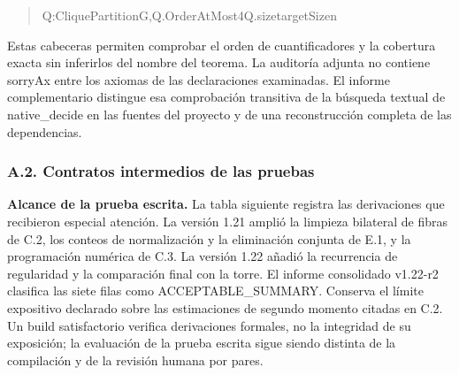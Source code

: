 \documentclass[spanish,11pt,a4paper]{article}
\newlength{\LeanCharWidth}
\begin{document}
\begin{quote}
\noindent \hspace*{\dimexpr 8\LeanCharWidth\relax}{\LeanSymbols ∃}\hspace*{\dimexpr 1\LeanCharWidth\relax}Q\hspace*{\dimexpr 1\LeanCharWidth\relax}:\hspace*{\dimexpr 1\LeanCharWidth\relax}CliquePartition\hspace*{\dimexpr 1\LeanCharWidth\relax}G,\hspace*{\dimexpr 1\LeanCharWidth\relax}Q.OrderAtMost\hspace*{\dimexpr 1\LeanCharWidth\relax}4\hspace*{\dimexpr 1\LeanCharWidth\relax}{\LeanSymbols ∧}\hspace*{\dimexpr 1\LeanCharWidth\relax}Q.size\hspace*{\dimexpr 1\LeanCharWidth\relax}{\LeanSymbols ≤}\hspace*{\dimexpr 1\LeanCharWidth\relax}targetSize\hspace*{\dimexpr 1\LeanCharWidth\relax}n\par
\end{quote}

Estas cabeceras permiten comprobar el orden de cuantificadores y la cobertura exacta sin inferirlos del nombre del teorema. La auditoría adjunta no contiene {\ttfamily\small sorryAx} entre los axiomas de las declaraciones examinadas. El informe complementario distingue esa comprobación transitiva de la búsqueda textual de {\ttfamily\small native\_\discretionary{\hbox{\ensuremath{\hookrightarrow}}}{}{}decide} en las fuentes del proyecto y de una reconstrucción completa de las dependencias.

\subsubsection{A.2. Contratos intermedios de las pruebas}\label{a.2.-contratos-intermedios-de-las-pruebas}

\textbf{Alcance de la prueba escrita.} La tabla siguiente registra las derivaciones que recibieron especial atención. La versión 1.21 amplió la limpieza bilateral de fibras de C.2, los conteos de normalización y la eliminación conjunta de E.1, y la programación numérica de C.3. La versión 1.22 añadió la recurrencia de regularidad y la comparación final con la torre. El informe consolidado v1.22-r2 clasifica las siete filas como {\ttfamily\small ACCEPTABLE\_\discretionary{\hbox{\ensuremath{\hookrightarrow}}}{}{}SUMMARY}. Conserva el límite expositivo declarado sobre las estimaciones de segundo momento citadas en C.2. Un build satisfactorio verifica derivaciones formales, no la integridad de su exposición; la evaluación de la prueba escrita sigue siendo distinta de la compilación y de la revisión humana por pares.
\end{document}
